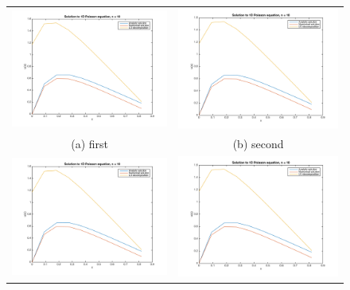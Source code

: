 \documentclass{article}
\begin{document}
\begin{multicols}{2}
\begin{figure}
\begin{tabular}{cc}
  \includegraphics[width=75mm]{Plot_n10.png} &   \includegraphics[width=75mm]{Plot_n10.png} \\
(a) first & (b) second \\[6pt]
 \includegraphics[width=75mm]{Plot_n10.png} &   \includegraphics[width=75mm]{Plot_n10.png} \\

\end{tabular}
\end{figure}
\end{multicols}
\end{document}
